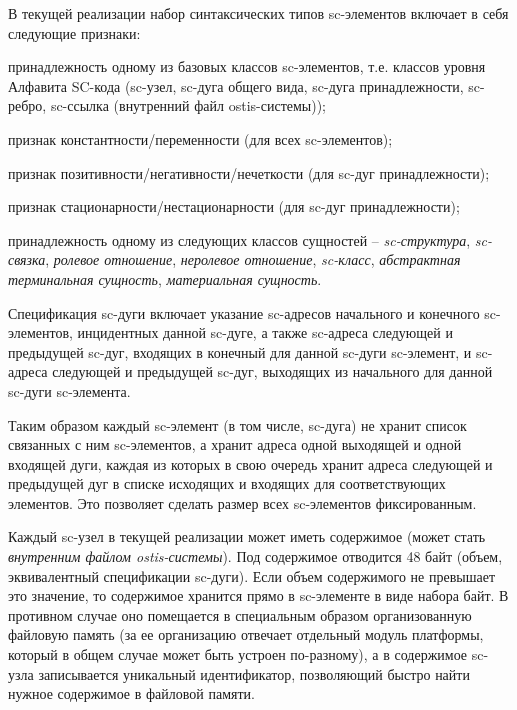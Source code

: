 \begin{SCn}
{В текущей реализации набор синтаксических типов sc-элементов  включает в себя следующие признаки:
\begin{scnitemize}
	\item принадлежность одному из базовых классов sc-элементов, т.е. классов уровня Алфавита SC-кода (sc-узел, sc-дуга общего вида, sc-дуга принадлежности, sc-ребро, sc-ссылка (внутренний файл ostis-системы));
	\item признак константности/переменности (для всех sc-элементов);
	\item признак позитивности/негативности/нечеткости (для sc-дуг принадлежности);
	\item признак стационарности/нестационарности (для sc-дуг принадлежности);	
	\item принадлежность одному из следующих классов сущностей -- \textit{sc-структура}, \textit{sc-связка}, \textit{ролевое отношение}, \textit{неролевое отношение}, \textit{sc-класс}, \textit{абстрактная терминальная сущность}, \textit{материальная сущность}.
\end{scnitemize}

Спецификация sc-дуги включает указание sc-адресов начального и конечного sc-элементов, инцидентных данной sc-дуге, а также sc-адреса следующей и предыдущей sc-дуг, входящих в конечный для данной sc-дуги sc-элемент, и sc-адреса следующей и предыдущей sc-дуг, выходящих из начального для данной sc-дуги sc-элемента. 

Таким образом каждый sc-элемент (в том числе, sc-дуга) не хранит список связанных с ним sc-элементов, а хранит адреса одной выходящей и одной входящей дуги, каждая из которых в свою очередь хранит адреса следующей и предыдущей дуг в списке исходящих и входящих для соответствующих элементов. Это позволяет сделать размер всех sc-элементов фиксированным.
	
Каждый sc-узел в текущей реализации может иметь содержимое (может стать \textit{внутренним файлом ostis-системы}). Под содержимое отводится 48 байт (объем, эквивалентный спецификации sc-дуги). Если объем содержимого не превышает это значение, то содержимое хранится прямо в sc-элементе в виде набора байт. В противном случае оно помещается в специальным образом организованную файловую память (за ее организацию отвечает отдельный модуль платформы, который в общем случае может быть устроен по-разному), а в содержимое sc-узла записывается уникальный идентификатор, позволяющий быстро найти нужное содержимое в файловой памяти.
}


\end{SCn}
